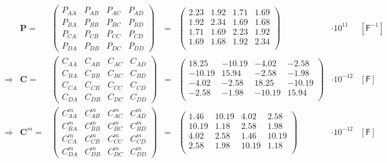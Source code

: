 \begin{equation} 
\label{eq:fid38-matrix-evaluation}
\begin{array}{rrccclc}
 & \bm{P} = &
 \begin{pmatrix}
P_{AA} & P_{AB} & P_{AC} & P_{AD} \\ 
P_{BA} & P_{BB} & P_{BC} & P_{BD} \\ 
P_{CA} & P_{CB} & P_{CC} & P_{CD} \\ 
P_{DA} & P_{DB} & P_{DC} & P_{DD}
\end{pmatrix}
&=&
\begin{pmatrix}
2.23 & 1.92 & 1.71 & 1.69 \\
1.92 & 2.34 & 1.69 & 1.68 \\
1.71 & 1.69 & 2.23 & 1.92 \\
1.69 & 1.68 & 1.92 & 2.34 \\
\end{pmatrix}
& \cdot 10^{11} & [\textsf{F}^{-1}] \\
\Rightarrow & \bm{C} = &
\begin{pmatrix}
C_{AA} & C_{AB} & C_{AC} & C_{AD} \\ 
C_{BA} & C_{BB} & C_{BC} & C_{BD} \\ 
C_{CA} & C_{CB} & C_{CC} & C_{CD} \\ 
C_{DA} & C_{DB} & C_{DC} & C_{DD}
\end{pmatrix}
&=&
\begin{pmatrix}
18.25 & -10.19 & -4.02 & -2.58 \\
-10.19 & 15.94 & -2.58 & -1.98 \\
-4.02 & -2.58 & 18.25 & -10.19 \\
-2.58 & -1.98 & -10.19 & 15.94 \\
\end{pmatrix}
& \cdot 10^{-12} & [\textsf{F}] \\
\Rightarrow & \bm{C}^m = &
\begin{pmatrix}
C_{AA}^m & C_{AB}^m & C_{AC}^m & C_{AD}^m \\ 
C_{BA}^m & C_{BB}^m & C_{BC}^m & C_{BD}^m \\ 
C_{CA}^m & C_{CB}^m & C_{CC}^m & C_{CD}^m \\ 
C_{DA}^m & C_{DB}^m & C_{DC}^m & C_{DD}^m
\end{pmatrix}
&=&
\begin{pmatrix}
1.46 & 10.19 & 4.02 & 2.58 \\
10.19 & 1.18 & 2.58 & 1.98 \\
4.02 & 2.58 & 1.46 & 10.19 \\
2.58 & 1.98 & 10.19 & 1.18 \\
\end{pmatrix}
& \cdot 10^{-12} & [\textsf{F}]
\end{array}
\end{equation}

